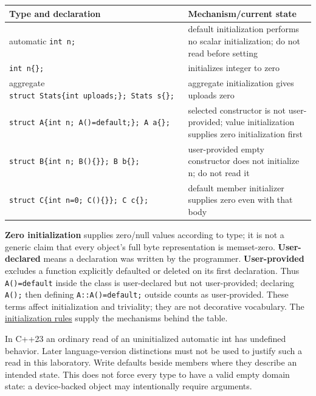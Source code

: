 {\def\LTcaptype{none} %
\begin{longtable}[]{@{}
  >{\raggedright\arraybackslash}p{}
  >{\raggedright\arraybackslash}p{}@{}}
\toprule\noalign{}
\begin{minipage}[b]{\linewidth}\raggedright
Type and declaration
\end{minipage} & \begin{minipage}[b]{\linewidth}\raggedright
Mechanism/current state
\end{minipage} \\
\midrule\noalign{}
\endhead
\bottomrule\noalign{}
\endlastfoot
automatic \texttt{int\ n;} & default initialization performs no scalar initialization; do not read before setting \\
\texttt{int\ n\{\};} & initializes integer to zero \\
aggregate \texttt{struct\ Stats\{int\ uploads;\};\ Stats\ s\{\};} & aggregate initialization gives uploads zero \\
\texttt{struct\ A\{int\ n;\ A()=default;\};\ A\ a\{\};} & selected constructor is not user-provided; value initialization supplies zero initialization first \\
\texttt{struct\ B\{int\ n;\ B()\{\}\};\ B\ b\{\};} & user-provided empty constructor does not initialize n; do not read it \\
\texttt{struct\ C\{int\ n=0;\ C()\{\}\};\ C\ c\{\};} & default member initializer supplies zero even with that body \\
\end{longtable}
}

\textbf{Zero initialization} supplies zero/null values according to type; it is not a generic claim that every object's full byte representation is memset-zero. \textbf{User-declared} means a declaration was written by the programmer. \textbf{User-provided} excludes a function explicitly defaulted or deleted on its first declaration. Thus \texttt{A()=default} inside the class is user-declared but not user-provided; declaring \texttt{A();} then defining \texttt{A::A()=default;} outside counts as user-provided. These terms affect initialization and triviality; they are not decorative vocabulary. The \href{https://eel.is/c++draft/dcl.init}{initialization rules} supply the mechanisms behind the table.

In C++23 an ordinary read of an uninitialized automatic int has undefined behavior. Later language-version distinctions must not be used to justify such a read in this laboratory. Write defaults beside members where they describe an intended state. This does not force every type to have a valid empty domain state: a device-backed object may intentionally require arguments.

